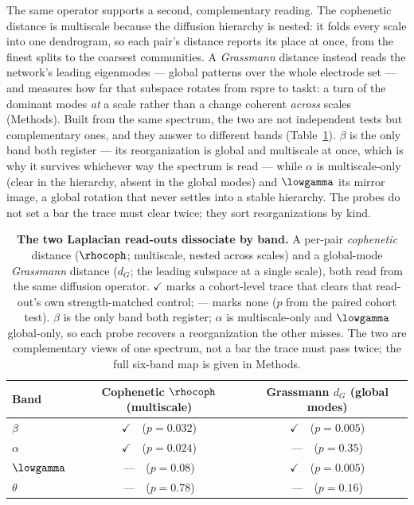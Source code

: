 The same operator supports a second, complementary reading. The cophenetic distance is multiscale because the diffusion hierarchy is nested: it folds every scale into one dendrogram, so each pair's distance reports its place at once, from the finest splits to the coarsest communities. A \emph{Grassmann} distance instead reads the network's leading eigenmodes --- global patterns over the whole electrode set --- and measures how far that subspace rotates from \acrshort{rspre} to \acrshort{taskt}: a turn of the dominant modes \emph{at} a scale rather than a change coherent \emph{across} scales (Methods). Built from the same spectrum, the two are not independent tests but complementary ones, and they answer to different bands (Table~\ref{tab:probe_band}). \(\beta\) is the only band both register --- its reorganization is global and multiscale at once, which is why it survives whichever way the spectrum is read --- while \(\alpha\) is multiscale-only (clear in the hierarchy, absent in the global modes) and \(\lowgamma\) its mirror image, a global rotation that never settles into a stable hierarchy. The probes do not set a bar the trace must clear twice; they sort reorganizations by kind.

%
\begin{table}[t]
    \centering
    \caption{\textbf{The two Laplacian read-outs dissociate by band.} A per-pair \emph{cophenetic} distance (\(\rhocoph\); multiscale, nested across scales) and a global-mode \emph{Grassmann} distance (\(d_{G}\); the leading subspace at a single scale), both read from the same diffusion operator. \(\checkmark\) marks a cohort-level trace that clears that read-out's own strength-matched control; --- marks none (\(p\) from the paired cohort test). \(\beta\) is the only band both register; \(\alpha\) is multiscale-only and \(\lowgamma\) global-only, so each probe recovers a reorganization the other misses. The two are complementary views of one spectrum, not a bar the trace must pass twice; the full six-band map is given in Methods.}
    \label{tab:probe_band}
    \begin{tabular}{lcc}
        \toprule
        Band & Cophenetic \(\rhocoph\) (multiscale) & Grassmann \(d_{G}\) (global modes) \\
        \midrule
        \(\beta\)     & \(\checkmark\)~~(\(p = 0.032\)) & \(\checkmark\)~~(\(p = 0.005\)) \\
        \(\alpha\)    & \(\checkmark\)~~(\(p = 0.024\)) & ---~~(\(p = 0.35\)) \\
        \(\lowgamma\) & ---~~(\(p = 0.08\))            & \(\checkmark\)~~(\(p = 0.005\)) \\
        \(\theta\)    & ---~~(\(p = 0.78\))            & ---~~(\(p = 0.16\)) \\
        \bottomrule
    \end{tabular}
\end{table}
%
